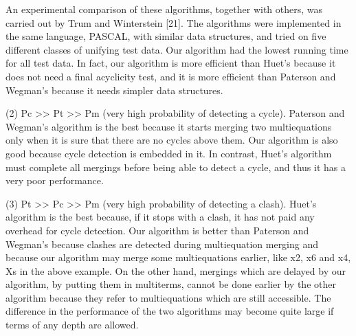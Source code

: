 An experimental comparison of these algorithms, together with others, was
carried out by Trum and Winterstein [21]. The algorithms were implemented in
the same language, PASCAL, with similar data structures, and tried on five
different classes of unifying test data. Our algorithm had the lowest running time
for all test data. In fact, our algorithm is more efficient than Huet's because it
does not need a final acyclicity test, and it is more efficient than Paterson and
Wegman's because it needs simpler data structures. 

(2) Pc >> Pt >> Pm (very high probability of detecting a cycle). Paterson and
Wegman's algorithm is the best because it starts merging two multiequations
only when it is sure that there are no cycles above them. Our algorithm is also
good because cycle detection is embedded in it. In contrast, Huet's algorithm
must complete all mergings before being able to detect a cycle, and thus it has a
very poor performance. 

(3) Pt >> Pc >> Pm (very high probability of detecting a clash). Huet's algorithm
is the best because, if it stops with a clash, it has not paid any overhead for
cycle detection. Our algorithm is better than Paterson and Wegman's because
clashes are detected during multiequation merging and because our algorithm
may merge some multiequations earlier, like {x2, x6} and {x4, Xs} in the above
example. On the other hand, mergings which are delayed by our algorithm, by
putting them in multiterms, cannot be done earlier by the other algorithm
because they refer to multiequations which are still accessible. The difference in
the performance of the two algorithms may become quite large if terms of any
depth are allowed.